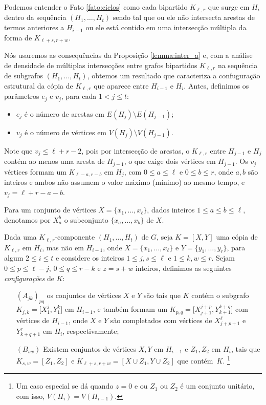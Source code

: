\documentclass[12pt,a4paper]{book}
\newcommand{\K}{K_{\ell,r}} %
\begin{document}
Podemos entender o Fato \ref{fato:ciclos} como cada bipartido $\K$ que surge em $H_i$ dentro da sequência $(H_1, \ldots, H_t)$ sendo tal que ou ele não intersecta arestas de termos anteriores a $H_{i-1}$ ou ele está contido em uma intersecção múltipla da forma de $K_{\ell+s, r+w}$. 

      Nós usaremos as consequências da Proposição \ref{lemma:inter_a} e, com a análise de densidade de múltiplas intersecções entre grafos bipartidos $\K$ na sequência de subgrafos $(H_1, \ldots, H_t)$, obtemos um resultado que caracteriza a confuguração estrutural da cópia de $\K$ que aparece entre $H_{i-1}$ e $H_i$.
     Antes, definimos os parâmetros $e_j$ e $v_j$, para cada $1 < j \leq t$:
     \begin{itemize}
         \item $e_j$ é o número de arestas em $E(H_{j}) \setminus E(H_{j-1})$;
         \item $v_j$ é o número de vértices em $V(H_{j}) \setminus V(H_{j-1})$. 
     \end{itemize}
     
     Note que $v_j \leq \ell+r-2$, pois por intersecção de arestas, o $\K$ entre $H_{j-1}$ e $H_{j}$ contém ao menos uma aresta de $H_{j-1}$, o que exige dois vértices em $H_{j-1}$. 
     Os $v_{j}$ vértices formam um $K_{\ell-a,r-b}$ em $H_{j}$, com $0 \leq a\leq \ell$ e $0\leq b\leq r$, onde $a,b$ são inteiros e ambos não assumem o valor máximo (mínimo) ao mesmo tempo, e $v_{j} = \ell+r-a-b$.
 

  Para um conjunto de vértices $X = \{x_1, \ldots, x_\ell\}$, dados inteiros $1 \leq a \leq b \leq \ell$, denotamos por $X_a^b$ o subconjunto $\{x_a, \ldots, x_b\}$ de $X$. 

    Dada uma $\K$-componente $(H_1, \ldots, H_t)$ de $G$, 
    seja $K = [X, Y]$ uma cópia de $\K$ em $H_i$, mas não em $H_{i-1}$, 
    onde $X = \{x_1, \ldots, x_\ell\}$ e $Y=\{y_1, \ldots, y_r\}$, para algum $2\leq i\leq t$
    e considere os inteiros $1 \leq j, s \leq \ell$ e $1 \leq k,w \leq r$.  
    Sejam $0 \leq p \leq \ell-j$, $0\leq q \leq r -k$ e $z = s+w$ inteiros, 
     definimos as seguintes \emph{configurações} de $K$: 
       \begin{enumerate}
       \item[$(A_{jk})_{pq}$]\label{configA} 
        os conjuntos de vértices $X$ e $Y$ são tais que $K$
    contém o subgrafo
    $K_{j,k} = \big[X_1^j, Y_1^k\big]$ em $H_{i-1}$, 
    e também formam um 
    $K_{p,q} = \big[X_{j+1}^{j+p}, Y_{k+1}^{k+q}\big]$
    com  vértices de $H_{i-1}$, onde $X$ e $Y$ são completados com vértices de
    $X_{j+p+1}^\ell$ e $Y_{k+q+1}^r$ em $H_i$, respectivamente;
                
       \item[$(B_{sw})$]\label{configB} 
        Existem conjuntos de vértices $X,Y$ em $H_{i-1}$ e $Z_1, Z_2$ em $H_i$, tais que
      $K_{s,w} = [Z_1, Z_2]$ e 
      $K_{\ell+s,r+w}= [X\cup Z_1, Y\cup Z_2]$ que contém~$K$.
      \footnote[1]{Um caso especial se dá quando $z = 0$ e 
     ou $Z_1$ ou $Z_2$ é um conjunto unitário, com isso, $V(H_i) = V(H_{i-1})$.}
       \end{enumerate}
  
\end{document}
